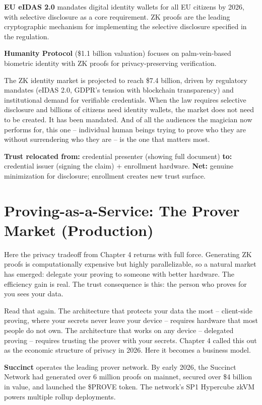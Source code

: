 \documentclass[
  11pt,
  openany]{report}
\renewcommand{\textbf}[1]{{\bfseries\color{MidnightBold}#1}}
\begin{document}
\textbf{EU eIDAS 2.0} mandates digital identity wallets for all EU citizens by
2026, with selective disclosure as a core requirement. ZK proofs are the leading
cryptographic mechanism for implementing the selective disclosure specified in
the regulation.

\textbf{Humanity Protocol} (\$1.1 billion valuation) focuses on palm-vein-based
biometric identity with ZK proofs for privacy-preserving verification.

The ZK identity market is projected to reach \$7.4 billion, driven by regulatory
mandates (eIDAS 2.0, GDPR's tension with blockchain transparency) and
institutional demand for verifiable credentials. When the law requires selective
disclosure and billions of citizens need identity wallets, the market does not
need to be created. It has been mandated. And of all the audiences the magician
now performs for, this one -- individual human beings trying to prove who they
are without surrendering who they are -- is the one that matters most.

\textbf{Trust relocated from:} credential presenter (showing full document)
\textbf{to:} credential issuer (signing the claim) + enrollment hardware.
\textbf{Net:} genuine minimization for disclosure; enrollment creates new trust
surface.

\section{Proving-as-a-Service: The Prover Market
(Production)}\label{proving-as-a-service-the-prover-market-production}

Here the privacy tradeoff from Chapter 4 returns with full force. Generating ZK
proofs is computationally expensive but highly parallelizable, so a natural
market has emerged: delegate your proving to someone with better hardware. The
efficiency gain is real. The trust consequence is this: the person who proves
for you sees your data.

Read that again. The architecture that protects your data the most --
client-side proving, where your secrets never leave your device -- requires
hardware that most people do not own. The architecture that works on any device
-- delegated proving -- requires trusting the prover with your secrets. Chapter
4 called this out as the economic structure of privacy in 2026. Here it becomes
a business model.

\textbf{Succinct} operates the leading prover network. By early 2026, the
Succinct Network had generated over 6 million proofs on mainnet, secured over
\$4 billion in value, and launched the \$PROVE token. The network's SP1
Hypercube zkVM powers multiple rollup deployments.
\end{document}
